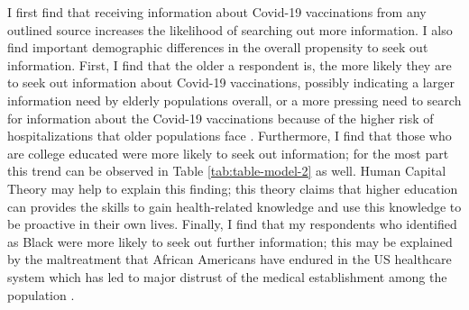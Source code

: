 I first find that receiving information about Covid-19 vaccinations from any
outlined source increases the likelihood of searching out more information. I
also find important demographic differences in the overall propensity to seek
out information. First, I find that the older a respondent is, the more likely
they are to seek out information about Covid-19 vaccinations, possibly
indicating a larger information need by elderly populations overall, or a more
pressing need to search for information about the Covid-19 vaccinations because
of the higher risk of hospitalizations that older populations face
\citep{turner_etal18}. Furthermore, I find that those who are college educated were
more likely to seek out information; for the most part this trend can be
observed in Table \ref{tab:table-model-2} as well. Human Capital Theory
\citep{mirowsky_ross98} may help to explain this finding; this theory claims that
higher education can provides the skills to gain health-related knowledge and
use this knowledge to be proactive in their own lives. Finally, I find that my
respondents who identified as Black were more likely to seek out further
information; this may be explained by the maltreatment that African Americans
have endured in the US healthcare system \citep{baileyStructuralRacismHealth2017}
which has led to major distrust of the medical establishment among the
population \citep{center2019, murray15, bronson2014don}.

